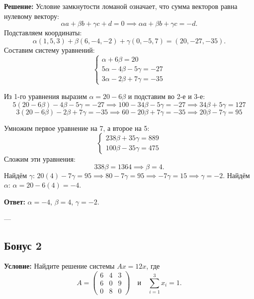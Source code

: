 \documentclass[11pt, a4paper]{article}
\begin{document}
\textbf{Решение:}
Условие замкнутости ломаной означает, что сумма векторов равна нулевому вектору:
$$ \alpha a + \beta b + \gamma c + d = 0 \implies \alpha a + \beta b + \gamma c = -d. $$
Подставляем координаты:
$$ \alpha(1, 5, 3) + \beta(6, -4, -2) + \gamma(0, -5, 7) = (20, -27, -35). $$
Составим систему уравнений:
$$ \begin{cases} \alpha + 6\beta = 20 \\ 5\alpha - 4\beta - 5\gamma = -27 \\ 3\alpha - 2\beta + 7\gamma = -35 \end{cases} $$

Из 1-го уравнения выразим $\alpha = 20 - 6\beta$ и подставим во 2-е и 3-е:
$$ 5(20 - 6\beta) - 4\beta - 5\gamma = -27 \implies 100 - 34\beta - 5\gamma = -27 \implies 34\beta + 5\gamma = 127 $$
$$ 3(20 - 6\beta) - 2\beta + 7\gamma = -35 \implies 60 - 20\beta + 7\gamma = -35 \implies 20\beta - 7\gamma = 95 $$

Умножим первое уравнение на 7, а второе на 5:
$$ \begin{cases} 238\beta + 35\gamma = 889 \\ 100\beta - 35\gamma = 475 \end{cases} $$
Сложим эти уравнения:
$$ 338\beta = 1364 \implies \beta = 4. $$
Найдём $\gamma$: $20(4) - 7\gamma = 95 \implies 80 - 7\gamma = 95 \implies -7\gamma = 15 \implies \gamma = -2$.
Найдём $\alpha$: $\alpha = 20 - 6(4) = -4$.

\textbf{Ответ:} $\alpha = -4$, $\beta = 4$, $\gamma = -2$.

---

\subsection*{Бонус 2}
\textbf{Условие:} Найдите решение системы $Ax = 12x$, где
$$ A = \begin{pmatrix} 6 & 4 & 3 \\ 6 & 0 & 9 \\ 0 & 8 & 0 \end{pmatrix} \quad \text{и} \quad \sum_{i=1}^3 x_i = 1. $$
\end{document}
